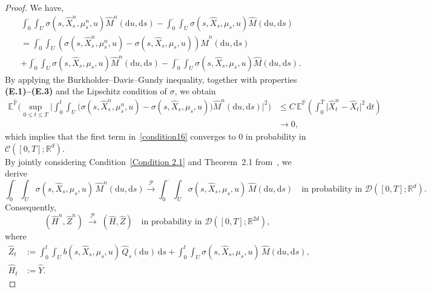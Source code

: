 \documentclass[11pt,amsfonts]{article}
\theoremstyle{plain}
\theoremstyle{assumpstyle}
\numberwithin{equation}{section}
\numberwithin{theorem}{section}
\numberwithin{proposition}{section}
\numberwithin{definition}{section}
\numberwithin{remark}{section}
\numberwithin{corollary}{section}
\numberwithin{lemma}{section}
\begin{document}
\begin{proof}
We have, 
\begin{equation}
\begin{split}
&\displaystyle\int_{0}^{\cdot}\int_{U}^{}\sigma(s, \hat{X}^n_s, \mu^n_s, u) \hat{M}^n(\mathrm{d}u,\mathrm{d}s) - \displaystyle\int_{0}^{\cdot}\int_{U}^{}\sigma(s, \hat{X}_{s}, \mu_{s}, u) \hat{M}(\mathrm{d}u,\mathrm{d}s)\\
&=\displaystyle\int_{0}^{\cdot}\int_{U}^{}(\sigma(s, \hat{X}^n_s, \mu^n_s, u) -\sigma(s, \hat{X}_{s}, \mu_{s}, u))\hat{M}^n(\mathrm{d}u,\mathrm{d}s) \\
&+\displaystyle\int_{0}^{\cdot}\int_{U}^{}\sigma(s, \hat{X}_{s}, \mu_{s}, u) \hat{M}^n(\mathrm{d}u,\mathrm{d}s)- \displaystyle\int_{0}^{\cdot}\int_{U}^{}\sigma(s, \hat{X}_{s}, \mu_{s}, u) \hat{M}(\mathrm{d}u, \mathrm{d}s). \label{condition16}
\end{split}
\end{equation}
By applying the Burkholder--Davis--Gundy inequality, together with properties \textbf{(E.1)--(E.3)} and the Lipschitz condition of $\sigma$, we obtain
\begin{align*}
\mathbb{E}^{\hat{\mathbb{P}}} \Bigg(
\sup_{0 \leq t \leq T} 
\Big| \int_{0}^{t} \int_{U} 
\big( \sigma(s, \hat{X}^n_{s}, \mu^n_{s}, u) 
- \sigma(s, \hat{X}_{s}, \mu_{s}, u) \big) 
\hat{M}^n(\mathrm{d}u, \mathrm{d}s) 
\Big|^2 \Bigg)
&\le 
C\, \mathbb{E}^{\hat{\mathbb{P}}} 
\left( \int_{0}^{T} 
\big| \hat{X}^n_t - \hat{X}_t \big|^2 
\, \mathrm{d}t \right)
\\
&\longrightarrow 0,
\end{align*}
which implies that the first term in~\eqref{condition16} converges to $0$ in probability in $\mathcal{C}([0, T]; \mathbb{R}^d)$.\\
By jointly considering Condition~\eqref{Condition 2.1} and Theorem~2.1 from~\cite{Cho}, we derive
\begin{equation*}\label{secondterm}
\int_{0}^{\cdot}\int_{U} 
\sigma(s, \hat{X}_{s}, \mu_{s}, u)\, 
\hat{M}^n(\mathrm{d}u, \mathrm{d}s)
\xrightarrow{\;\mathcal{P}\;}
\int_{0}^{\cdot}\int_{U} 
\sigma(s, \hat{X}_{s}, \mu_{s}, u)\, 
\hat{M}(\mathrm{d}u, \mathrm{d}s) 
\quad \text{in probability in } \mathcal{D}([0, T]; \mathbb{R}^d).
\end{equation*}
Consequently,
\begin{equation*}
(\hat{H}^n, \hat{Z}^n) \;\xrightarrow{\mathcal{P}}\; (\hat{H}, \hat{Z})
\quad \text{in probability in } \mathcal{D}([0, T]; \mathbb{R}^{2d}),
\end{equation*}
where
\begin{align*}
\hat{Z}_t 
&:= 
\int_{0}^{t}\int_{U} 
b(s, \hat{X}_{s}, \mu_s, u)\, 
\hat{Q}_s(\mathrm{d}u)\,\mathrm{d}s
+ 
\int_{0}^{t}\int_{U} 
\sigma(s, \hat{X}_{s}, \mu_{s}, u)\, 
\hat{M}(\mathrm{d}u, \mathrm{d}s),
\\[4pt]
\hat{H}_t &:= \hat{Y}.
\end{align*}


\end{proof}
\end{document}
